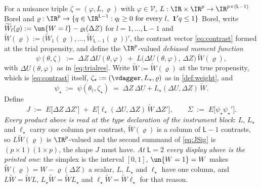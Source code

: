 \begin{definition}\label{def:moment}
For a nuisance triple $\zeta=(\varphi,L,\varrho)$ with $\varphi\in\mathcal V$,
$L:\IR\times\IR^{p}\to\IR^{p\times(\mathsf L-1)}$ Borel and
$\varrho:\IR^{p}\to\{q\in\IR^{\mathsf L-1}:q_l\ge0\ \text{for every }l,\ \mathbf 1'q\le1\}$ Borel, write
$\widetilde W_l(\varrho):=\un\{W=l\}-\varrho_l(\Delta Z)$ for $l=1,\dots,\mathsf L-1$ and
$\widetilde W(\varrho):=\big(\widetilde W_1(\varrho),\dots,\widetilde W_{\mathsf L-1}(\varrho)\big)'$, the
contrast vector \eqref{eq:contrast} formed at the trial propensity, and define the
$\IR^{p}$-valued \emph{debiased moment function}
\begin{equation}\label{eq:psidef}
\psi(\theta,\zeta)\;:=\;\Delta Z\,\Delta U(\theta,\varphi)\;+\;
L\big(\Delta U(\theta,\varphi),\,\Delta Z\big)\,\widetilde W(\varrho),
\end{equation}
with $\Delta U(\theta,\varphi)$ as in \eqref{eq:trialres}. Write $\widetilde W:=\widetilde W(\varrho)$ at the
true propensity, which is \eqref{eq:contrast} itself,
$\zeta_\star:=(\vdagger,L_\star,\varrho)$ as in \cref{def:weight}, and
\begin{equation}\label{eq:psistar}
\psi_\star\;:=\;\psi(\theta_\dagger,\zeta_\star)\;=\;\Delta Z\,\Delta U+L_\star(\Delta U,\Delta Z)\,\widetilde W.
\end{equation}
Define
\begin{equation}\label{eq:JSig}
J\;:=\;E\big[\Delta Z\,\Delta Z'\big]\;+\;E\big[\ell_\star(\Delta U,\Delta Z)\,\widetilde W\,\Delta Z'\big],
\qquad
\Sigma\;:=\;E\big[\psi_\star\psi_\star'\big] .
\end{equation}
\emph{Every product above is read at the type declaration of the instrument block}: $L$, $L_\star$ and
$\ell_\star$ carry one column per contrast, $\widetilde W(\varrho)$ is a column of $\mathsf L-1$ contrasts,
so $L\widetilde W(\varrho)$ is $\IR^{p}$-valued and the second summand of \eqref{eq:JSig} is
$(p\times1)(1\times p)$, the shape $J$ must have. \emph{At $\mathsf L=2$ every display above is the printed
one}: the simplex is the interval $[0,1]$, $\un\{W=1\}=W$ makes
$\widetilde W(\varrho)=W-\varrho(\Delta Z)$ a scalar, $L$, $L_\star$ and $\ell_\star$ have one column, and
$L\widetilde W=\widetilde WL$, $L_\star\widetilde W=\widetilde WL_\star$ and
$\ell_\star\widetilde W=\widetilde W\ell_\star$ for that reason.

\end{definition}
